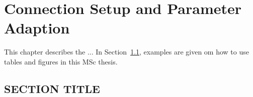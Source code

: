 \chapter{Connection Setup and Parameter Adaption}
\label{chp:chapter_3}

This chapter describes the ... In Section~\ref{sec:SECTIONTITLE}, examples are given om how to use tables and figures in this MSc thesis.

\section{SECTION TITLE}
\label{sec:SECTIONTITLE}
